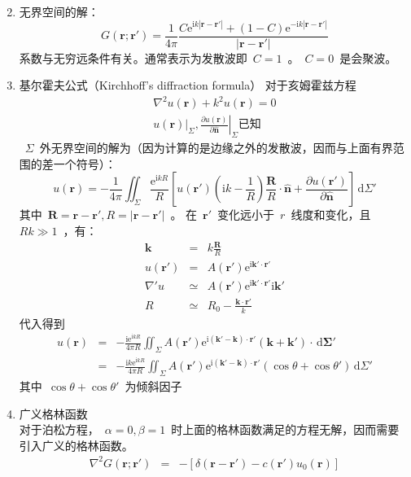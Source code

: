 \documentclass[12pt,a4paper]{article}
\newcommand\diff{\,\mathrm{d}}
\renewcommand*{\vec}[1]{\bm{#1}}%
\renewcommand{\[}{\ $\displaystyle}
\renewcommand{\]}{$\ }%
\newcommand{\pard}[2]{\ensuremath{\frac{\partial #1}{\partial #2}}}
\newcommand\mi{\mathrm{i}}
\newcommand\e{\mathrm{e}}
\begin{document}
\begin{enumerate}
\begin{eqnarray*}
	    	\end{eqnarray*}
	    \item 无界空间的解：
	    $$
	      G(\vec r ; \vec r') = \frac 1{4\pi}\frac{C\e^{\mi k|\vec r - \vec r'|}+(1-C)\e^{-\mi k|\vec r - \vec r'|}}{|\vec r - \vec r'|}
	    $$
	    系数与无穷远条件有关。通常表示为发散波即\[C = 1\]。\[C =0\]是会聚波。
	    \item 基尔霍夫公式（Kirchhoff's diffraction formula）
	    对于亥姆霍兹方程
	    \begin{eqnarray*}
	     \nabla^2 u(\vec r) + k^2 u(\vec r) = 0\\
	     u(\vec r)|_\Sigma ,\left.\pard{u(\vec r)}{\hat{\vec n}}\right|_{\Sigma}\mbox{已知}
	    \end{eqnarray*}
	    \[\Sigma\]外无界空间的解为（因为计算的是边缘之外的发散波，因而与上面有界范围的差一个符号）：
	    $$
	      u(\vec r) = -\frac{1}{4\pi}\iint_\Sigma \frac{\e^{\mi k R}}{R}\left[u(\vec r')\left( \mi k - \frac{1}{R}\right)\frac {\vec R}R\cdot \hat{\vec n}+\pard{u(\vec r')}{\hat{\vec n}} \right]\diff\Sigma'
	    $$
	    其中\[\vec R = \vec r - \vec r',R = |\vec r - \vec r'|\]。
	    在\[\vec r'\]变化远小于\[r\]线度和变化，且\[R k \gg 1\]，有：
	    \begin{eqnarray*}
	     \vec k &=& k\frac{\vec R}{R} \\
	     u(\vec r') &= & A(\vec r') \e^{\mi \vec k'\cdot\vec r'}\\
	     \nabla'u &\simeq & A(\vec r') \e^{\mi \vec k'\cdot\vec r'}\mi \vec k' \\	     
	     R &\simeq & R_0 - \frac{\vec k \cdot \vec r'}{k}
	    \end{eqnarray*}
	    代入得到
	    \begin{eqnarray*}
	       u(\vec r) &=& -\frac{\mi\e^{\mi kR}}{4\pi R}\iint_\Sigma A(\vec r') \e^{\mi(\vec k' - \vec k)\cdot \vec r'}(\vec k + \vec k')\cdot\diff\vec\Sigma' \\
	        &=& -\frac{\mi k\e^{\mi kR}}{4\pi R}\iint_\Sigma A(\vec r') \e^{\mi(\vec k' - \vec k)\cdot \vec r'}(\cos\theta + \cos\theta')\diff\Sigma'
	    \end{eqnarray*}
	    其中\[\cos\theta + \cos\theta'\]为倾斜因子
	    \item 广义格林函数\\
	    	对于泊松方程，\[\alpha = 0,\beta = 1\]时上面的格林函数满足的方程无解，因而需要引入广义的格林函数。
	    	\begin{eqnarray*}
	    	 \nabla^2 G(\vec r;\vec r') &=& -\left[\delta(\vec r - \vec r') - c(\vec r')u_0(\vec r)\right] \\

\end{eqnarray*}
\end{enumerate}
\end{document}
